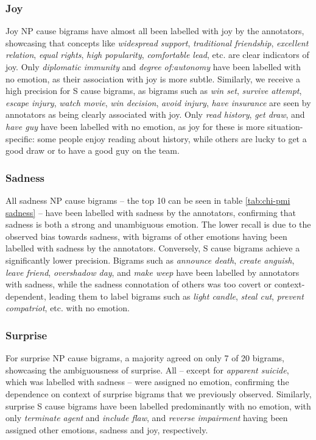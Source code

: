 \subsubsection{Joy}

Joy NP cause bigrams have almost all been labelled with joy by the annotators, showcasing that concepts like \textit{widespread support}, \textit{traditional friendship}, \textit{excellent relation}, \textit{equal rights}, \textit{high popularity}, \textit{comfortable lead}, etc. are clear indicators of joy. Only \textit{diplomatic immunity} and \textit{degree of:autonomy} have been labelled with no emotion, as their association with joy is more subtle.
Similarly, we receive a high precision for S cause bigrams, as bigrams such as \textit{win set}, \textit{survive attempt}, \textit{escape injury}, \textit{watch movie}, \textit{win decision}, \textit{avoid injury}, \textit{have insurance} are seen by annotators as being clearly associated with joy. Only \textit{read history}, \textit{get draw}, and \textit{have guy} have been labelled with no emotion, as joy for these is more situation-specific: some people enjoy reading about history, while others are lucky to get a good draw or to have a good guy on the team.

\subsubsection{Sadness}

All sadness NP cause bigrams -- the top 10 can be seen in table \ref{tab:chi-pmi sadness} -- have been labelled with sadness by the annotators, confirming that sadness is both a strong and unambiguous emotion. The lower recall is due to the observed bias towards sadness, with bigrams of other emotions having been labelled with sadness by the annotators.
Conversely, S cause bigrams achieve a significantly lower precision. Bigrams such as \textit{announce death}, \textit{create anguish}, \textit{leave friend}, \textit{overshadow day}, and \textit{make weep} have been labelled by annotators with sadness, while the sadness connotation of others was too covert or context-dependent, leading them to label bigrams such as \textit{light candle}, \textit{steal cut}, \textit{prevent compatriot}, etc. with no emotion.

\subsubsection{Surprise}

For surprise NP cause bigrams, a majority agreed on only 7 of 20 bigrams, showcasing the ambiguousness of surprise. All -- except for \textit{apparent suicide}, which was labelled with sadness -- were assigned no emotion, confirming the dependence on context of surprise bigrams that we previously observed.
Similarly, surprise S cause bigrams have been labelled predominantly with no emotion, with only \textit{terminate agent} and \textit{include flaw}, and \textit{reverse impairment} having been assigned other emotions, sadness and joy, respectively.

